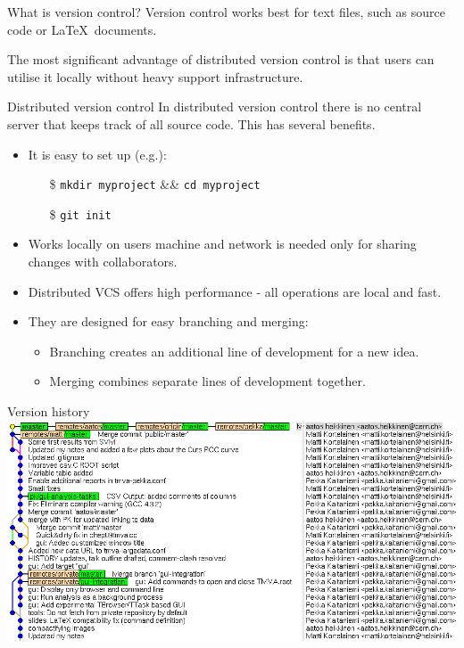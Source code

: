 \documentclass[final,hyperref={pdfpagelabels=false},notitlepage=true]{beamer}
\begin{document}
\begin{frame}{}
\begin{columns}[t]
\begin{column}{0.45\linewidth}
\begin{block}{\large What is version control?}
      \vskip1cm
      Version control {\color{orange} works best for} text files, such as {\color{orange} source code} or \LaTeX\ documents.

\vskip1cm
The most significant advantage of distributed version control is that 
users can utilise it locally without heavy support infrastructure.

    \end{block}

    \vskip2cm
    \begin{block}{\large Distributed version control}
      \vskip1cm
      In distributed version control there is {\color{orange} no central server}
      that keeps track of all source code. This has several benefits.
      \vskip1cm
      \begin{itemize}
        \item It is easy to set up (e.g.):
          \begin{itemize}
            \item[\$] {\tt mkdir myproject} \&\& {\tt cd myproject}
            \item[\$] {\tt git init}
          \end{itemize}
          \vskip1cm
        \item Works locally on users machine and network is needed
          only for sharing changes with collaborators.
          \vskip1cm
        \item Distributed VCS offers high performance - all operations are local and fast.
          \vskip1cm
        \item They are {\color{orange} designed for easy branching and merging}:
          \begin{itemize}
            \item Branching creates an additional line of
              development for a new idea.
            \item Merging combines separate lines of development
              together.
          \end{itemize}
      \end{itemize}
    \end{block}

    \vskip2cm
    \begin{block}{\large Version history}
      \vskip1cm
      \includegraphics[width=1.0\linewidth]{images/gitk-history-detail.png}
    \end{block}


\end{column}
\end{columns}
\end{frame}
\end{document}
